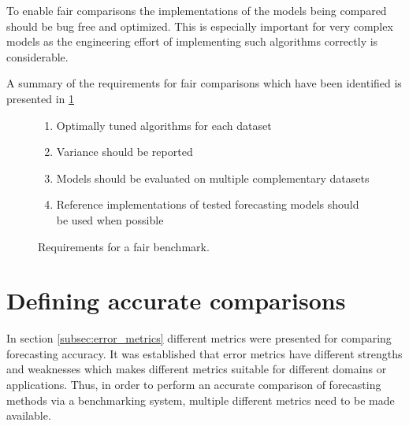 To enable fair comparisons the implementations of the models being compared should be bug free and optimized. This is especially important for very complex models as the engineering effort of implementing such algorithms correctly is considerable.

A summary of the requirements for fair comparisons which have been identified is presented in \ref{fig:fair_requirements}
\begin{figure}[h]
    \begin{enumerate}
        \item Optimally tuned algorithms for each dataset
        \item Variance should be reported
        \item Models should be evaluated on multiple complementary datasets
        \item Reference implementations of tested forecasting models should be used when possible
    \end{enumerate}
    \caption{Requirements for a fair benchmark.}
    \label{fig:fair_requirements}
\end{figure}

\section{Defining accurate comparisons}
In section \ref{subsec:error_metrics} different metrics were presented for comparing forecasting accuracy. It was established that error metrics have different strengths and weaknesses which makes different metrics suitable for different domains or applications.
Thus, in order to perform an accurate comparison of forecasting methods via a benchmarking system, multiple different metrics need to be made available.

